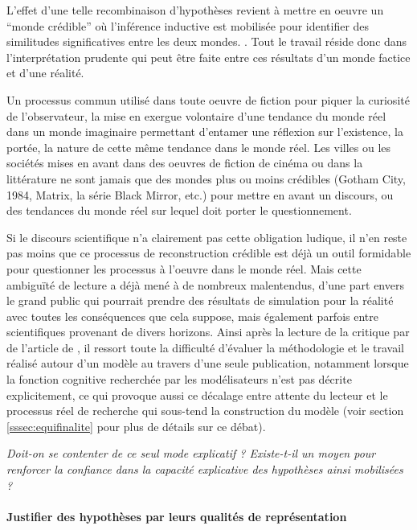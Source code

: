 L'effet d'une telle recombinaison d'hypothèses revient à mettre en oeuvre un \enquote{monde crédible} où l'inférence inductive est mobilisée pour identifier des similitudes significatives entre les deux mondes. \autocites{Livet2006, Phan2008}. Tout le travail réside donc dans l'interprétation prudente qui peut être faite entre ces résultats d'un monde factice et d'une réalité.

Un processus commun utilisé dans toute oeuvre de fiction pour piquer la curiosité de l'observateur, la mise en exergue volontaire d'une tendance du monde réel dans un monde imaginaire permettant d'entamer une réflexion sur l'existence, la portée, la nature de cette même tendance dans le monde réel. Les villes ou les sociétés mises en avant dans des oeuvres de fiction de cinéma ou dans la littérature ne sont jamais que des mondes plus ou moins crédibles (Gotham City, 1984, Matrix, la série Black Mirror, etc.)  pour mettre en avant un discours, ou des tendances du monde réel sur lequel doit porter le questionnement. %

Si le discours scientifique n'a clairement pas cette obligation ludique, il n'en reste pas moins que ce processus de reconstruction crédible est déjà un outil formidable pour questionner les processus à l'oeuvre dans le monde réel. Mais cette ambiguïté de lecture a déjà mené à de nombreux malentendus, d'une part envers le grand public \autocites{Forrester2007,Deffuant2003} qui pourrait prendre des résultats de simulation pour la réalité avec toutes les conséquences que cela suppose, mais également parfois entre scientifiques provenant de divers horizons. Ainsi après la lecture de la critique par \textcite{Chattoe2011} de l'article de \textcite{Yanoff2008}, il ressort toute la difficulté d'évaluer la méthodologie et le travail réalisé autour d'un modèle au travers d'une seule publication, notamment lorsque la fonction cognitive recherchée par les modélisateurs n'est pas décrite explicitement, ce qui provoque aussi ce décalage entre attente du lecteur et le processus réel de recherche qui sous-tend la construction du modèle (voir section \ref{sssec:equifinalite} pour plus de détails sur ce débat).

\textit{Doit-on se contenter de ce seul mode explicatif ? Existe-t-il un moyen pour renforcer la confiance dans la capacité explicative des hypothèses ainsi mobilisées ? }

\paragraph{Justifier des hypothèses par leurs qualités de représentation}
\label{justifier_hypothese}

